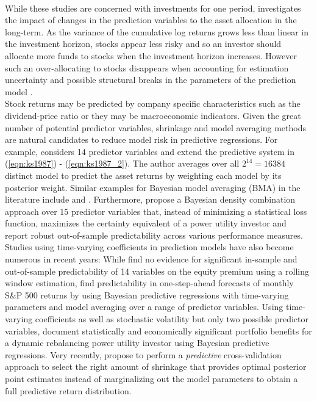 \\
%
\indent While these studies are concerned with investments for one period, \cite{barberis2000} investigates the impact of changes in the prediction variables to the asset allocation in the long-term. As the variance of the cumulative log returns grows less than linear in the investment horizon, stocks appear less risky and so an investor should allocate more funds to stocks when the investment horizon increases. However such an over-allocating to stocks disappears when accounting for estimation uncertainty and possible structural breaks in the parameters of the prediction model \citep{pettenuzzo2011}.\\
%
\indent Stock returns may be predicted by company specific characteristics such as the dividend-price ratio or they may be macroeconomic indicators. Given the great number of potential predictor variables, shrinkage and model averaging methods are natural candidates to reduce model risk in predictive regressions. For example, \citet{avramov2002} considers 14 predictor variables and extend the predictive system in (\ref{eqn:ks1987}) - (\ref{eqn:ks1987_2}). The author averages over all $2^{14}=16384$ distinct model to predict the asset returns by weighting each model by its posterior weight. Similar examples for Bayesian model averaging (BMA) in the literature include \citet{cremers2002} and \citet{wachter2015}. Furthermore, \citet{pettenuzzo2016} propose a Bayesian density combination approach over 15 predictor variables that, instead of minimizing a statistical loss function, maximizes the certainty equivalent of a power utility investor and report robust out-of-sample predictability across various performance measures.\\
%
\indent Studies using time-varying coefficients in prediction models have also become numerous in recent years: While \cite{welch2008} find no evidence for significant in-sample and out-of-sample predictability of 14 variables on the equity premium using a rolling window estimation, \cite{dangl2012} find predictability in one-step-ahead forecasts of monthly S\&P 500 returns by using Bayesian predictive regressions with time-varying parameters and model averaging over a range of predictor variables. Using time-varying coefficients as well as stochastic volatility but only two possible predictor variables, \cite{johannes2014} document statistically and economically significant portfolio benefits for a dynamic rebalancing power utility investor using Bayesian predictive regressions. Very recently, \cite{feng2016} propose to perform a \textit{predictive} cross-validation approach to select the right amount of shrinkage that provides optimal posterior point estimates instead of marginalizing out the model parameters to obtain a full predictive return distribution. \\
